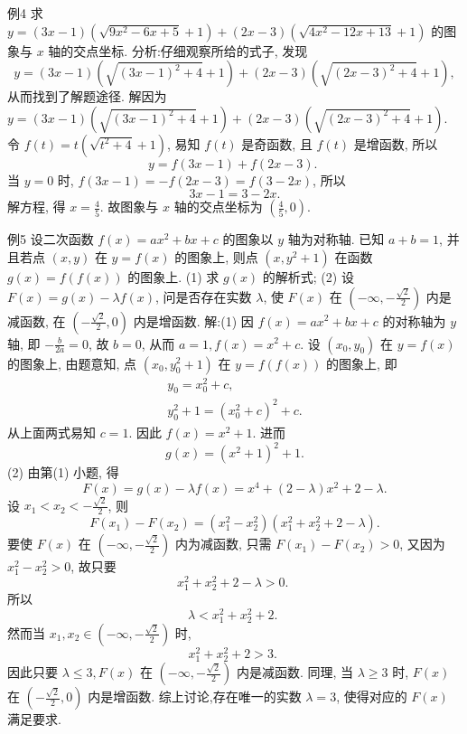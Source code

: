 例4 求 $y=(3 x-1)\left(\sqrt{9 x^2-6 x+5}+1\right)+(2 x-3)\left(\sqrt{4 x^2-12 x+13}+ 1\right)$ 的图象与 $x$ 轴的交点坐标.
分析:仔细观察所给的式子, 发现
$$
y=(3 x-1)\left(\sqrt{(3 x-1)^2+4}+1\right)+(2 x-3)\left(\sqrt{(2 x-3)^2+4}+1\right),
$$
从而找到了解题途径.
解因为 $y=(3 x-1)\left(\sqrt{(3 x-1)^2+4}+1\right)+(2 x-3) \left(\sqrt{(2 x-3)^2+4}+1\right)$.
令 $f(t)=t\left(\sqrt{t^2+4}+1\right)$, 易知 $f(t)$ 是奇函数, 且 $f(t)$ 是增函数, 所以
$$
y=f(3 x-1)+f(2 x-3) \text {. }
$$
当 $y=0$ 时, $f(3 x-1)=-f(2 x-3)=f(3-2 x)$, 所以
$$
3 x-1=3-2 x .
$$
解方程, 得 $x=\frac{4}{5}$.
故图象与 $x$ 轴的交点坐标为 $\left(\frac{4}{5}, 0\right)$.



例5 设二次函数 $f(x)=a x^2+b x+c$ 的图象以 $y$ 轴为对称轴.
已知 $a+b=1$, 并且若点 $(x, y)$ 在 $y=f(x)$ 的图象上, 则点 $\left(x, y^2+1\right)$ 在函数 $g(x)=f(f(x))$ 的图象上.
(1) 求 $g(x)$ 的解析式;
(2) 设 $F(x)=g(x)-\lambda f(x)$, 问是否存在实数 $\lambda$, 使 $F(x)$ 在 $\left(-\infty,-\frac{\sqrt{2}}{2}\right)$ 内是减函数, 在 $\left(-\frac{\sqrt{2}}{2}, 0\right)$ 内是增函数.
解:(1) 因 $f(x)=a x^2+b x+c$ 的对称轴为 $y$ 轴, 即 $-\frac{b}{2 a}=0$, 故 $b=0$,
从而 $a=1, f(x)=x^2+c$.
设 $\left(x_0, y_0\right)$ 在 $y=f(x)$ 的图象上, 由题意知, 点 $\left(x_0, y_0^2+1\right)$ 在 $y= f(f(x))$ 的图象上, 即
$$
\begin{gathered}
y_0=x_0^2+c, \\
y_0^2+1=\left(x_0^2+c\right)^2+c .
\end{gathered}
$$
从上面两式易知 $c=1$. 因此 $f(x)=x^2+1$. 进而
$$
g(x)=\left(x^2+1\right)^2+1 .
$$
(2) 由第(1) 小题, 得
$$
F(x)=g(x)-\lambda f(x)=x^4+(2-\lambda) x^2+2-\lambda .
$$
设 $x_1<x_2<-\frac{\sqrt{2}}{2}$, 则
$$
F\left(x_1\right)-F\left(x_2\right)=\left(x_1^2-x_2^2\right)\left(x_1^2+x_2^2+2-\lambda\right) .
$$
要使 $F(x)$ 在 $\left(-\infty,-\frac{\sqrt{2}}{2}\right)$ 内为减函数, 只需 $F\left(x_1\right)-F\left(x_2\right)>0$, 又因为 $x_1^2-x_2^2>0$, 故只要
$$
x_1^2+x_2^2+2-\lambda>0 \text {. }
$$
所以
$$
\lambda<x_1^2+x_2^2+2 \text {. }
$$
然而当 $x_1, x_2 \in\left(-\infty,-\frac{\sqrt{2}}{2}\right)$ 时,
$$
x_1^2+x_2^2+2>3 \text {. }
$$
因此只要 $\lambda \leqslant 3, F(x)$ 在 $\left(-\infty,-\frac{\sqrt{2}}{2}\right)$ 内是减函数.
同理, 当 $\lambda \geqslant 3$ 时, $F(x)$ 在 $\left(-\frac{\sqrt{2}}{2}, 0\right)$ 内是增函数.
综上讨论,存在唯一的实数 $\lambda=3$, 使得对应的 $F(x)$ 满足要求.



